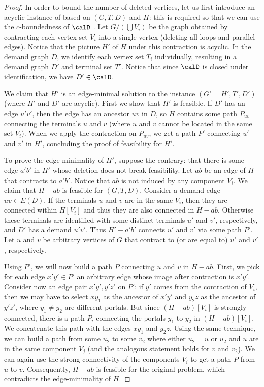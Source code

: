 \begin{proof}
In order to bound the number of deleted vertices, let us first introduce an acyclic instance of \Dsnfull based on $(G,T,D)$ and $H$: this is required so that we can use the $c$-boundedness of $\calD$ . Let $G/(\bigcup V_i)$ be the graph obtained by contracting each vertex set $V_i$ into a single vertex (deleting all loops and parallel edges). Notice that the picture $H'$ of $H$ under this contraction is acyclic. In the demand graph $D$, we identify each vertex set $T_i$ individually, resulting in a demand graph $D'$ and terminal set $T'$. Notice that since $\calD$ is closed under identification, we have $D'\in \calD$. 

We claim that $H'$ is an edge-minimal solution to the 
\Dsnfull instance $(G'=H',T',D')$ (where $H'$ and $D'$ are acyclic). First we show that $H'$ is feasible. If $D'$ has an edge $u'v'$, then the edge has an ancestor $uv$ in $D$, so $H$ contains some path $P_{uv}$ connecting the terminals $u$ and $v$ (where $u$ and $v$ cannot be located in the same set $V_i$). When we apply the contraction on $P_{uv}$, we get a path $P'$ connecting $u'$ and $v'$ in $H'$, concluding the proof of feasibility for $H'$.

To prove the edge-minimality of $H'$, suppose the contrary: that there is some edge $a'b'$ in $H'$ whose deletion does not break feasibility. Let $ab$ be an edge of $H$ that contracts to $a'b'$. Notice that $ab$ is not induced by any component $V_i$. We claim that $H-ab$ is feasible for $(G,T,D)$. Consider a demand edge $uv\in E(D)$. If the terminals $u$ and $v$ are in the same $V_i$, then they are connected within $H[V_i]$ and thus they are also connected in $H-ab$. Otherwise these terminals are identified with some distinct terminals $u'$ and $v'$, respectively, and $D'$ has a demand $u'v'$. Thus $H'-a'b'$ connects $u'$ and $v'$ via some path $P'$. Let $u$ and $v$ be arbitrary vertices of $G$ that contract to (or are equal to) $u'$ and $v'$, respectively.

Using $P'$, we will now build a path $P$ connecting $u$ and $v$ in $H-ab$. First, we pick for each edge $x'y' \in P'$ an arbitrary edge whose image after contraction is $x'y'$. Consider now an edge pair $x'y', y'z'$ on $P'$: if $y'$ comes from the contraction of $V_i$, then we may have to select $xy_1$ as the ancestor of $x'y'$ and $y_2z$ as the ancestor of $y'z'$, where $y_1 \neq y_2$ are different portals. But since $(H-ab)[V_i]$ is strongly connected, there is a path $P_i$ connecting the portals $y_1$ to $y_2$ in $(H-ab)[V_i]$. We concatenate this path with the edges $xy_1$ and $y_2z$. Using the same technique, we can build a path from some $u_2$ to some $v_2$ where either $u_2=u$ or $u_2$ and $u$ are in the same component $V_j$ (and the analogous statement holds for $v$ and $v_2$). We can again use the strong connectivity of the components $V_i$ to get a path $P$ from $u$ to $v$. Consequently, $H-ab$ is feasible for the original problem, which contradicts the edge-minimality of $H$.


\end{proof}
